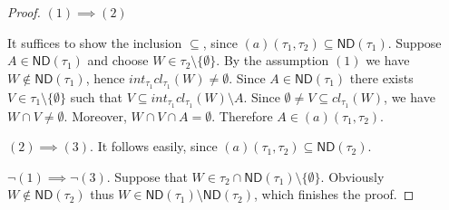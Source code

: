 \documentclass[12pt]{amsart}
\theoremstyle{plain}
\theoremstyle{definition}
\theoremstyle{remark}
\newcommand{\cl}{\mathit{cl}}
\newcommand{\real}{\mathbb{R}}
\newcommand{\cK}{{\mathcal K}}
\newcommand{\mathint}{\mathit{int}}
\newcommand{\aideal}{\mathit{(a)}}
\newcommand{\topWithoutEmptyset}[1]{#1\setminus\lbrace\emptyset\rbrace}
\begin{document}
\begin{proof}  
$(1) \implies (2)$

It suffices to show the inclusion $\subseteq$, since
$\aideal(\tau_1, \tau_2) \subseteq \mathsf{ND}(\tau_1)$.
Suppose $A\in \mathsf{ND}(\tau_1)$ and choose
$W \in \tau_2\setminus\lbrace \emptyset \rbrace$.
By the assumption $(1)$ we have $W \not\in \mathsf{ND}(\tau_1)$, 
hence $\mathint_{\tau_1} \cl_{\tau_1} (W) \not= \emptyset$.
Since $A \in \mathsf{ND}(\tau_1)$ there exists 
$V\in \tau_1\setminus\lbrace\emptyset\rbrace$ such 
that $V \subseteq \mathint_{\tau_1} \cl_{\tau_1} (W) \setminus A$. 
Since $\emptyset \not= V \subseteq \cl_{\tau_1} (W)$, 
we have $W \cap V \not= \emptyset$. Moreover,
$W \cap V \cap A = \emptyset$. Therefore 
$A \in \aideal(\tau_1, \tau_2)$.

$(2) \implies (3)$.
It follows easily, since 
$\aideal(\tau_1, \tau_2) \subseteq \mathsf{ND}(\tau_2)$.

$\neg(1)\implies \neg(3)$.
Suppose that $W\in\tau_2\cap\mathsf{ND}(\tau_1) \setminus \lbrace\emptyset\rbrace$.
Obviously $W\not\in\mathsf{ND}(\tau_2)$ thus
$W \in \mathsf{ND}(\tau_1) \setminus \mathsf{ND}(\tau_2)$,
which finishes the proof.
\end{proof}
\end{document}
